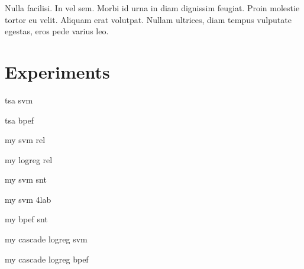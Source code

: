 \begin{savequote}[75mm]
Nulla facilisi. In vel sem. Morbi id urna in diam dignissim feugiat. Proin molestie tortor eu velit. Aliquam erat volutpat. Nullam ultrices, diam tempus vulputate egestas, eros pede varius leo.
\end{savequote}

\chapter{Experiments}


tsa svm

tsa bpef

my svm rel

my logreg rel

my svm snt

my svm 4lab

my bpef snt

my cascade logreg svm

my cascade logreg bpef